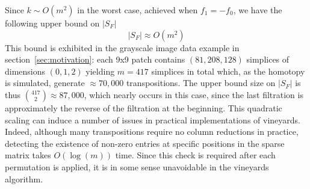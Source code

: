 \documentclass{siamart190516}
\begin{document}
Since $k \sim O(m^2)$ in the worst case, achieved when $f_1 = - f_0$, we have the following upper bound on $\lvert S_F \rvert$
\begin{equation}\label{eq:sf_m2}
	\lvert S_F \rvert \approx O(m^2)
\end{equation}   
 This bound is exhibited in the grayscale image data example in section~\ref{sec:motivation}: each 9x9 patch contains $(81, 208, 128)$ simplices of dimensions $(0, 1, 2)$ yielding $m=417$ simplices in total which, as the homotopy is simulated, generate $\approx 70,\!000$ transpositions. The upper bound size on $\lvert S_F \rvert$ is thus $\binom{417}{2} \approx 87,\!000$, which nearly occurs in this case, since the last filtration is approximately the reverse of the filtration at the beginning.   
 This quadratic scaling can induce a number of issues in practical implementations of vineyards.
 Indeed, although many transpositions require no column reductions in practice, detecting the existence of non-zero entries at specific positions in the sparse matrix takes $O(\log(m))$ time. 
 Since this check is required after each permutation is applied, it is in some sense unavoidable in the vineyards algorithm. 
\end{document}
